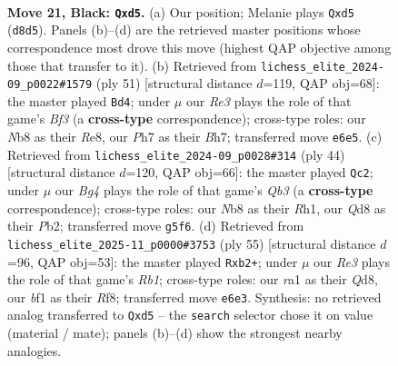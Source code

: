 \documentclass[11pt]{article}
\begin{document}
\clearpage

\begin{figure}[p]\centering
\begin{subfigure}{0.46\textwidth}\centering
\resizebox{\linewidth}{!}{%
\newchessgame
\chessboard[
  setfen={rnbq4/pp4kp/4r2p/1P1N2b1/3P2P1/4PP2/2QKN3/R4B1R b - - 0 21},
  showmover=false,
  pgfstyle=straightmove, color=movearrow, markmove={d8-d5}
]}
\caption{}
\end{subfigure}\hfill
\begin{subfigure}{0.46\textwidth}\centering
\resizebox{\linewidth}{!}{%
\newchessgame
\chessboard[
  setfen={2r1r2k/1R4pb/p2p1b1p/q2P1p2/4pP2/1QP1N1P1/1P4BP/4R2K b - - 0 26},
  showmover=false,
  pgfstyle=straightmove, color=movearrow, markmove={f6-d4}
]}
\caption{}
\end{subfigure}
\\[4pt]
\begin{subfigure}{0.46\textwidth}\centering
\resizebox{\linewidth}{!}{%
\newchessgame
\chessboard[
  setfen={r1q2n1r/5kp1/2p2bp1/1p1p4/3P1B2/1Q1B2P1/PP5P/1K3R1R w - - 0 23},
  showmover=false,
  pgfstyle=straightmove, color=movearrow, markmove={b3-c2}
]}
\caption{}
\end{subfigure}\hfill
\begin{subfigure}{0.46\textwidth}\centering
\resizebox{\linewidth}{!}{%
\newchessgame
\chessboard[
  setfen={1r1q1r2/5ppk/p2p2b1/3N2Pp/3bPR1N/3P2BP/QP6/1K1R4 b - - 2 28},
  showmover=false,
  pgfstyle=straightmove, color=movearrow, markmove={b8-b2}
]}
\caption{}
\end{subfigure}
\caption{\textbf{Move 21, Black: \texttt{Qxd5}.} (a) Our position; Melanie plays \texttt{Qxd5} (\texttt{d8d5}). Panels (b)--(d) are the retrieved master positions whose correspondence most drove this move (highest QAP objective among those that transfer to it). (b) Retrieved from \texttt{lichess\_elite\_2024-09\_p0022\#1579} (ply 51) [structural distance $d$=119, QAP obj=68]: the master played \texttt{Bd4}; under $\mu$ our \emph{Re3} plays the role of that game's \emph{Bf3} (a \textbf{cross-type} correspondence); cross-type roles: our \emph{N}b8 as their \emph{R}e8, our \emph{P}h7 as their \emph{B}h7; transferred move \texttt{e6e5}. (c) Retrieved from \texttt{lichess\_elite\_2024-09\_p0028\#314} (ply 44) [structural distance $d$=120, QAP obj=66]: the master played \texttt{Qc2}; under $\mu$ our \emph{Bg4} plays the role of that game's \emph{Qb3} (a \textbf{cross-type} correspondence); cross-type roles: our \emph{N}b8 as their \emph{R}h1, our \emph{Q}d8 as their \emph{P}b2; transferred move \texttt{g5f6}. (d) Retrieved from \texttt{lichess\_elite\_2025-11\_p0000\#3753} (ply 55) [structural distance $d$=96, QAP obj=53]: the master played \texttt{Rxb2+}; under $\mu$ our \emph{Re3} plays the role of that game's \emph{Rb1}; cross-type roles: our \emph{r}a1 as their \emph{Q}d8, our \emph{b}f1 as their \emph{R}f8; transferred move \texttt{e6e3}. Synthesis: no retrieved analog transferred to \texttt{Qxd5} -- the \texttt{search} selector chose it on value (material / mate); panels (b)--(d) show the strongest nearby analogies.}
\label{fig:thought-m41}
\end{figure}
\end{document}
